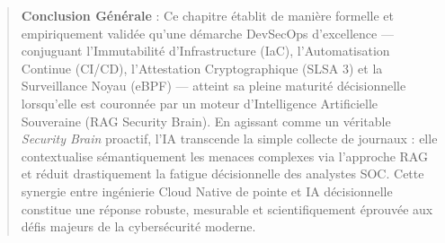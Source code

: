 \begin{quote}
\textbf{Conclusion Générale} : Ce chapitre établit de manière formelle et empiriquement validée qu'une démarche DevSecOps d'excellence — conjuguant l'Immutabilité d'Infrastructure (IaC), l'Automatisation Continue (CI/CD), l'Attestation Cryptographique (SLSA 3) et la Surveillance Noyau (eBPF) — atteint sa pleine maturité décisionnelle lorsqu'elle est couronnée par un moteur d'Intelligence Artificielle Souveraine (RAG Security Brain). En agissant comme un véritable \textit{Security Brain} proactif, l'IA transcende la simple collecte de journaux : elle contextualise sémantiquement les menaces complexes via l'approche RAG et réduit drastiquement la fatigue décisionnelle des analystes SOC. Cette synergie entre ingénierie Cloud Native de pointe et IA décisionnelle constitue une réponse robuste, mesurable et scientifiquement éprouvée aux défis majeurs de la cybersécurité moderne.
\end{quote}